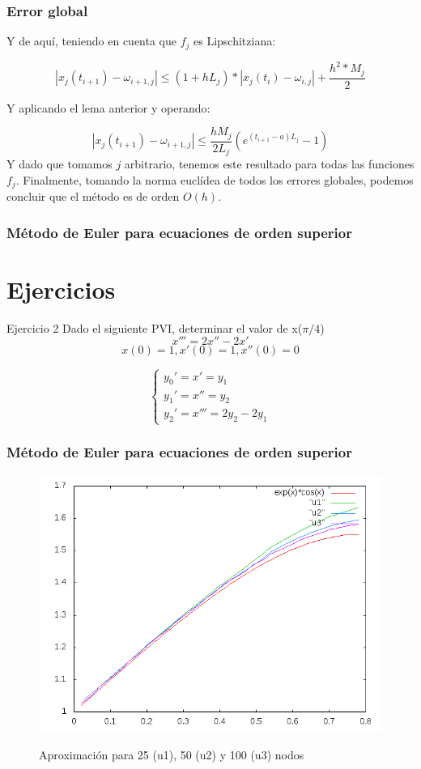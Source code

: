 \documentclass{beamer}
\begin{document}
\begin{frame}
	\frametitle{Error global}
	Y de aquí, teniendo en cuenta que $f_j$ es Lipschitziana:
	
	$$ | x_j(t_{i+1}) - \omega_{i+1,j} | \leq (1+hL_j)*| x_j(t_i) - \omega_{i,j} | + \frac{h^2*M_j}{2} $$
	
	Y aplicando el lema anterior y operando:
	
	$$ | x_j(t_{i+1}) - \omega_{i+1, j} | \leq \frac{hM_j}{2L_j}(e^{(t_{i+1}-a)L_j} - 1) $$
	Y dado que tomamos $j$ arbitrario, tenemos este resultado para todas las funciones $f_j$. Finalmente, tomando la norma euclídea de todos los errores globales, podemos concluir que el método es de orden $O(h)$.
\end{frame}

\begin{frame}
	\frametitle{Método de Euler para ecuaciones de orden superior}

\section{Ejercicios}


\begin{block}{Ejercicio 2}
	Dado el siguiente PVI, determinar el valor de x($\pi/4$)
	$$
	x''' = 2x'' - 2x'     %
	$$
	$$
	x(0)=1, x'(0)=1, x''(0)=0
	$$
\end{block}

$$
\begin{cases}
y_0' = x' = y_1\\
y_1' = x'' = y_2\\
y_2' = x''' = 2y_2 - 2y_1
\end{cases}
$$

\end{frame}

\begin{frame}
	\frametitle{Método de Euler para ecuaciones de orden superior}

	\begin{figure}[H]
	\centering
	\includegraphics[scale=0.45]{img/graphic.png}
	\label{figura1}
	\caption{Aproximación para 25 (u1), 50 (u2) y 100 (u3) nodos} 
	\end{figure}


\end{frame}
\end{document}
